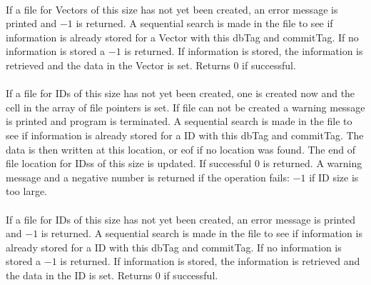 \\
If a file for Vectors of this size has not yet been created, an error message
is printed and $-1$ is returned.  A sequential search
is made in the file to see if information is already stored for a Vector with
this \p dbTag and \p commitTag. If no information is stored a
$-1$ is returned. If information is stored, the information is
retrieved and the data in the Vector is set. Returns $0$ if
successful. \\

\\
If a file
for IDs of this size has not yet been created, one is created now
and the cell in the array of file pointers is set. If file can not be
created a warning message is printed and program is terminated. A sequential search
is made in the file to see if information is already stored for a ID with
this \p dbTag and \p commitTag. The data is then written at this
location, or eof if no location was found. The end of file location
for IDss of this size is updated. If successful $0$ is
returned. A warning message and a negative number is returned if the
operation fails: $-1$ if ID size is too large. \\

\\
If a file for IDs of this size has not yet been created, an error message
is printed and $-1$ is returned.  A sequential search
is made in the file to see if information is already stored for a ID with
this \p dbTag and \p commitTag. If no information is stored a
$-1$ is returned. If information is stored, the information is
retrieved and the data in the ID is set. Returns $0$ if successful. 
